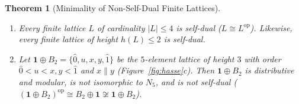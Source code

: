 \documentclass[11pt]{article}
\newtheorem{theorem}{Theorem}[section]
\theoremstyle{definition}
\newcommand{\op}{\mathrm{op}}
\begin{document}
\begin{theorem}[Minimality of Non-Self-Dual Finite Lattices]
\label{thm:minimal-nsd}
\leavevmode
\begin{enumerate}
  \item Every finite lattice $L$ of cardinality $|L| \le 4$ is self-dual
  ($L \cong L^{\op}$). Likewise, every finite lattice of height $h(L) \le 2$ is
  self-dual.
  \item Let $\mathbf{1} \oplus B_2 = \{\hat{0}, u, x, y, \hat{1}\}$ be the
  $5$-element lattice of height $3$ with order $\hat{0} < u < x, y < \hat{1}$
  and $x \parallel y$ (Figure~\ref{fig:hasse}c). Then $\mathbf{1} \oplus B_2$ is
  distributive and modular, is \emph{not} isomorphic to $N_5$, and is
  \emph{not} self-dual ($(\mathbf{1} \oplus B_2)^{\op} \cong B_2 \oplus \mathbf{1}
  \not\cong \mathbf{1} \oplus B_2$).
\end{enumerate}
\end{theorem}
\end{document}
